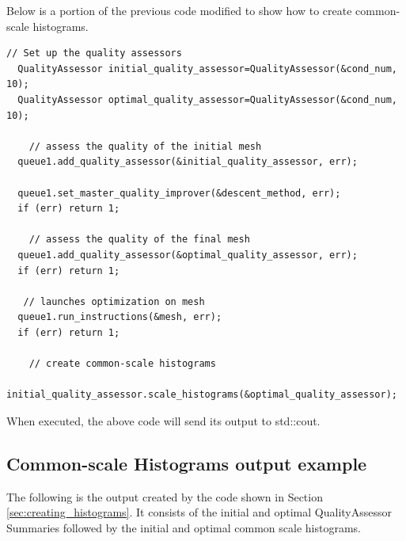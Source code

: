  Below is a portion of the previous code modified to show how to create common-scale histograms.
\begin{lstlisting}[frame=single]
    // Set up the quality assessors
  QualityAssessor initial_quality_assessor=QualityAssessor(&cond_num, 10);
  QualityAssessor optimal_quality_assessor=QualityAssessor(&cond_num, 10);

    // assess the quality of the initial mesh
  queue1.add_quality_assessor(&initial_quality_assessor, err);

  queue1.set_master_quality_improver(&descent_method, err);
  if (err) return 1;

    // assess the quality of the final mesh
  queue1.add_quality_assessor(&optimal_quality_assessor, err);
  if (err) return 1;

   // launches optimization on mesh
  queue1.run_instructions(&mesh, err);
  if (err) return 1;

    // create common-scale histograms
  initial_quality_assessor.scale_histograms(&optimal_quality_assessor);
\end{lstlisting}

When executed, the above code will send its output to std::cout.

\clearpage
\subsection{Common-scale Histograms output example}

The following is the output created by the code shown in Section \ref{sec:creating_histograms}.  It consists of the initial and optimal QualityAssessor Summaries followed by the initial and optimal common scale histograms.

